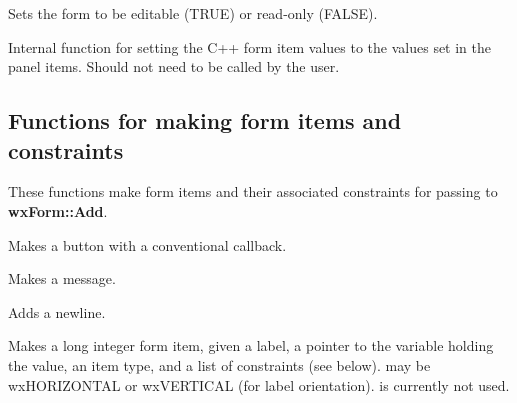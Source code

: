 

Sets the form to be editable (TRUE) or read-only (FALSE).



Internal function for setting the C++ form item values to the values set
in the panel items. Should not need to be called by the user.


\subsection{Functions for making form items and constraints}

These functions make form items and their associated constraints for
passing to {\bf wxForm::Add}.


Makes a button with a conventional callback.


Makes a message.


Adds a newline.


Makes a long integer form item, given a label, a pointer to the variable
holding the value, an item type, and a list of constraints (see below).
 may be wxHORIZONTAL or wxVERTICAL (for label orientation).
 is currently not used.


